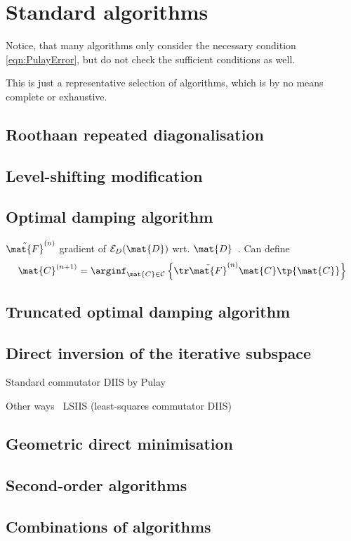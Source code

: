 \section{Standard \SCF algorithms}
\label{sec:SCFAlgorithms}


Notice, that many \SCF algorithms only consider the necessary condition \eqref{eqn:PulayError},
but do not check the sufficient conditions as well.


This is just a representative selection of algorithms,
which is by no means complete or exhaustive.

\subsection{Roothaan repeated diagonalisation}
\label{sec:RoothaanRepeatedDiag}

\subsection{Level-shifting modification}

\subsection{Optimal damping algorithm}
\label{sec:ODA}
$\tilde{\mat{F}}^{(n)}$ gradient of $\mathcal{E}_D(\mat{D})$
wrt. $\mat{D}$~\cite{Lions1988,Cances2000}.
Can define~\cite{Lions1988,Cances2000}
\[
	\mat{C}^{(n+1)} = \arginf_{\mat{C} \in \mathcal{C}}
\left\{ \tr \tilde{\mat{F}}^{(n)} \mat{C} \tp{\mat{C}} \right\} \]

\subsection{Truncated optimal damping algorithm}

\subsection{Direct inversion of the iterative subspace}

Standard commutator DIIS by Pulay

Other ways~\cite{Shepard2007}
LSIIS (least-squares commutator DIIS)~\cite{Li2016}

\subsection{Geometric direct minimisation}

\subsection{Second-order \SCF algorithms}

\subsection{Combinations of algorithms}
